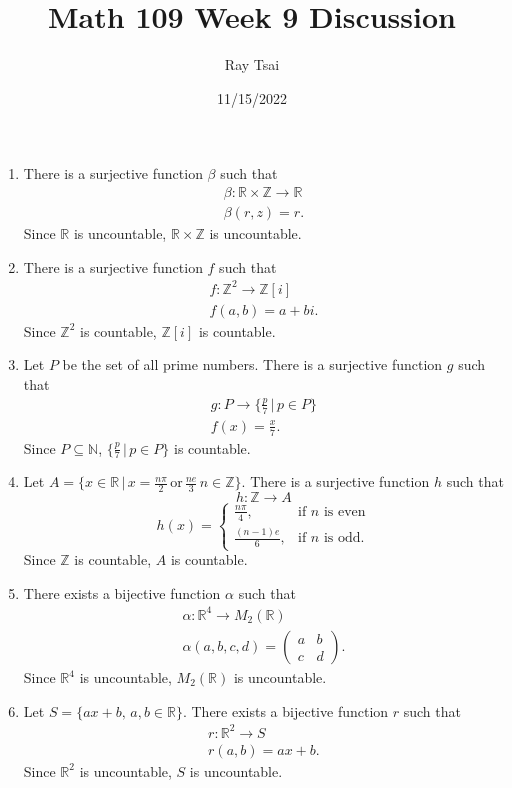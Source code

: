 \documentclass{article}
\title{Math 109 Week 9 Discussion}
\author{Ray Tsai}
\date{11/15/2022}
\begin{document}
\maketitle

\begin{enumerate}
    \item 
    There is a surjective function $\beta$ such that 
    \begin{gather}
        \beta: \mathbb{R} \times \mathbb{Z} \rightarrow \mathbb{R} \\
        \beta(r, z) = r.
    \end{gather}
    Since $\mathbb{R}$ is uncountable, $\mathbb{R} \times \mathbb{Z}$ is uncountable.

    \item
    There is a surjective function $f$ such that
    \begin{gather}
        f:  \mathbb{Z}^2 \rightarrow \mathbb{Z}[i] \\
            f(a, b) = a + bi.
    \end{gather}
    Since $\mathbb{Z}^2$ is countable, $\mathbb{Z}[i]$ is countable.

    \item
    Let $P$ be the set of all prime numbers. There is a surjective function $g$ such that 
    \begin{gather}
        g:  P \rightarrow \{\frac{p}{7}\,|\,p \in P \}  \\
            f(x) = \frac{x}{7}.
    \end{gather}
    Since $P \subseteq \mathbb{N}$, $\{\frac{p}{7}\,|\, p \in P \}$ is countable.

    \item
    Let $A = \{x \in \mathbb{R} \, | \, x = \frac{n\pi}{2} \, \text{or} \, \frac{ne}{3} \, n \in \mathbb{Z} \}$. There is a surjective function $h$ such that
    \[
        h: \mathbb{Z} \rightarrow A
    \]
    \[
        h(x) = \begin{cases}
            \frac{n\pi}{4}, & \text{if $n$ is even} \\
            \frac{(n - 1)e}{6}, & \text{if $n$ is odd}.
            \end{cases}
    \]
    Since $\mathbb{Z}$ is countable, $A$ is countable.

    \item
    There exists a bijective function $\alpha$ such that 
    \begin{gather}
        \alpha: \mathbb{R}^4 \rightarrow M_2(\mathbb{R}) \\
        \alpha(a, b, c, d) = \begin{pmatrix}
            a & b \\
            c & d
        \end{pmatrix}.
    \end{gather}
    Since $\mathbb{R}^4$ is uncountable, $M_2(\mathbb{R})$ is uncountable.

    \item
    Let $S = \{ax + b, \, a, b \in \mathbb{R}\}$. There exists a bijective function $r$ such that 
    \begin{gather}
        r: \mathbb{R}^2 \rightarrow S \\
        r(a, b) = ax + b.
    \end{gather}
    Since $\mathbb{R}^2$ is uncountable, $S$ is uncountable.
\end{enumerate}
\end{document}
